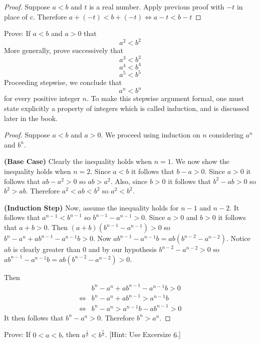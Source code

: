 \begin{proof}
    Suppose $a < b$ and $t$ is a real number.
    Apply previous proof with $-t$ in place of $c$.
    Therefore $a + (-t) < b + (-t) \iff a - t < b - t$
\end{proof}

\begin{tcolorbox}[title=Problem 6, breakable]
    Prove: If $a < b$ and $a > 0$ that 
    \[a^2 < b^2\]
    More generally, prove successively that
    \[a^3 < b^3\]
    \[a^4 < b^4\]
    \[a^5 < b^5\]
    Proceeding stepwise, we conclude that 
    \[a^n < b^n\]
    for every positive integer $n$. To make this stepwise argument formal,
    one must state explicitly a property of integers which is called induction,
    and is discussed later in the book.
\end{tcolorbox}

\begin{proof}
    Suppose $a < b$ and $a > 0$. We proceed using induction 
        on $n$ considering $a^n$ and $b^n$.

    \textbf{(Base Case)} Clearly the inequality holds when $n = 1$.
    We now show the inequality holds when $n = 2$. Since $a < b$ it follows that $b - a > 0$.
    Since $a > 0$ it follows that $ab - a^2 > 0$ so $ab > a^2$.
    Also, since $b > 0$ it follows that $b^2 - ab > 0$ so $b^2 > ab$.
    Therefore $a^2 < ab < b^2$ so $a^2 < b^2$.

    \textbf{(Induction Step)} 
    Now, assume the inequality holds for $n - 1$ and $n - 2$.
    It follows that $a^{n - 1} < b^{n - 1}$ so $b^{n - 1} - a^{n - 1} > 0$.
    Since $a > 0$ and $b > 0$ it follows that $a + b > 0$.
    Then $(a + b)(b^{n - 1} - a^{n - 1}) > 0$ so $b^n - a^n + ab^{n - 1} - a^{n - 1}b > 0$.
    Now $ab^{n - 1} - a^{n - 1}b = ab(b^{n - 2} - a^{n - 2})$. 
    Notice $ab$ is clearly greater than $0$ and by our hypothesis $b^{n - 2} - a^{n - 2} > 0$
        so $ab^{n - 1} - a^{n - 1}b = ab(b^{n - 2} - a^{n - 2}) > 0$.

    Then
    \begin{align*}
        &b^n - a^n + ab^{n - 1} - a^{n - 1}b > 0  \\
        \iff &b^n - a^n + ab^{n - 1} > a^{n - 1}b \\
        \iff &b^n - a^n > a^{n - 1}b - ab^{n - 1} > 0
    \end{align*}
    It then follows that $b^n - a^n > 0$.
    Therefore $b^n > a^n$.
\end{proof}

\begin{tcolorbox}[title=Problem 7, breakable]
    Prove: If $0 < a < b$, then $a^{\frac{1}{n}} < b^{\frac{1}{n}}$. [Hint: Use Excersize $6$.]
\end{tcolorbox}

